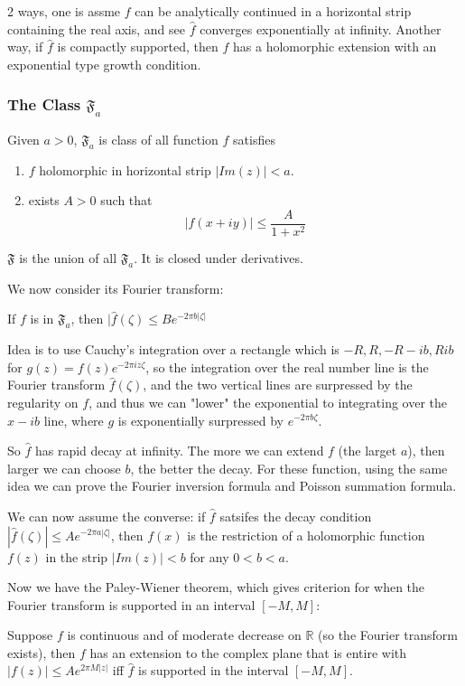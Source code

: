 \documentclass[main.tex]{subfiles}
\newcommand{\F}[1]{
\mathfrak{F}_{#1}}
\begin{document}
2 ways, one is assme $f$ can be analytically continued in a horizontal strip containing the real axis, and see $\hat{f}$ converges exponentially at infinity. Another way, if $\hat{f}$ is compactly supported, then $f$ has a holomorphic extension with an exponential type growth condition.

\subsubsection{The Class $\F{a}$}
\begin{definition}
Given $a > 0$, $\F{a}$ is class of all function $f$ satisfies
\begin{enumerate}
    \item $f$ holomorphic in horizontal strip $|Im(z)| < a$.
    \item exists $A> 0$ such that 
    $$
    |f(x+iy)| \leq \frac{A}{1 + x^2}
    $$
\end{enumerate}
\end{definition}
$\mathfrak{F}$ is the union of all $\F{a}$. It is closed under derivatives. 

We now consider its Fourier transform:
\begin{theorem}
If $f$ is in $\F{a}$, then $|\hat{f}(\zeta) \leq B e^{-2 \pi b |\zeta|}$
\end{theorem}

Idea is to use Cauchy's integration over a rectangle which is $-R, R, -R-ib, R  ib$ for $g(z) = f(z) e^{-2\pi i z \zeta}$, 
so the integration over the real number line is
the Fourier transform $\hat{f}(\zeta)$, and the two vertical lines are surpressed by the regularity on $f$, and thus we can "lower" the exponential to integrating over the $x -ib $ line, where $g$ is exponentially surpressed by $e^{-2 \pi b \zeta}$.

So $\hat{f}$ has rapid decay at infinity. The more we can extend $f$ (the larget $a$), then larger we can choose $b$, the better the decay. For these function, using the same idea we can prove the Fourier inversion formula and Poisson summation formula.

We can now assume the converse: if $\hat{f}$ satsifes the decay condition $|\hat{f}(\zeta)| \leq A e^{-2\pi a |\zeta|}$, then $f(x)$ is the restriction of a holomorphic function $f(z)$ in the strip $|Im(z)| < b$ for any $0 < b < a$.

Now we have the Paley-Wiener theorem, which gives criterion for when the Fourier transform is supported in an interval $[-M, M]$:
\begin{theorem}
Suppose $f$ is continuous and of moderate decrease on $\mathbb{R}$ (so the Fourier transform exists), then $f$ has an extension to the complex plane that is entire with $|f(z)| \leq Ae^{2 \pi M |z|}$ iff $\hat{f}$ is supported in the interval $[-M, M]$.
\end{theorem}
\end{document}

